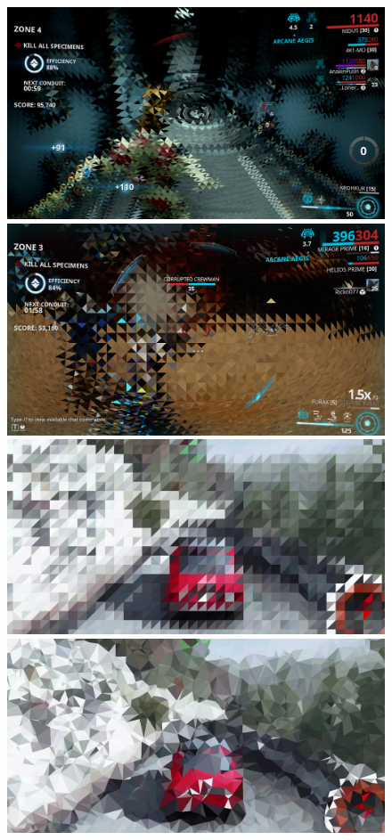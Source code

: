 \begin{figure}[!ht]
\includegraphics[scale=.152]{images/tri1.png}
\includegraphics[scale=.152]{images/tri2.png}\\
\includegraphics[scale=.13]{images/tri3.png}
\includegraphics[scale=.13]{images/tri4.png}

\end{figure}
